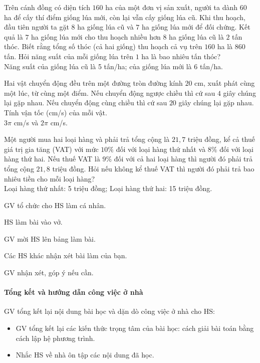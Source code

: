 \begin{baitap}[1.26]
	Trên cánh đồng có diện tích $160$ ha của một đơn vị sản xuất, người ta dành $60$ ha để cấy thí điểm giống lúa mới, còn lại vẫn cấy giống lúa cũ. Khi thu hoạch, đầu tiên người ta gặt $8$ ha giống lúa cũ và $7$ ha giống lúa mới để đối chứng. Kết quả là $7$ ha giống lúa mới cho thu hoạch nhiều hơn $8$ ha giống lúa cũ là $2$ tấn thóc. Biết rằng tổng số thóc (cả hai giống) thu hoạch cả vụ trên $160$ ha là $860$ tấn. Hỏi năng suất của mỗi giống lúa trên $1$ ha là bao nhiêu tấn thóc?
	\doicot
	\huongdan\\
	Năng suất của giống lúa cũ là 5 tấn/ha; của giống lúa mới là 6 tấn/ha.
\end{baitap}

\begin{baitap}[1.27]
	Hai vật chuyển động đều trên một đường tròn đường kính $20$ cm, xuất phát cùng một lúc, từ cùng một điểm. Nếu chuyển động ngược chiều thì cứ sau $4$ giây chúng lại gặp nhau. Nếu chuyển động cùng chiều thì cứ sau $20$ giây chúng lại gặp nhau. Tính vận tốc (cm/s) của mỗi vật.
	\doicot
	\huongdan\\
	$3\pi$ cm/s và $2\pi$ cm/s.
\end{baitap}

\begin{baitap}[1.28]
	Một người mua hai loại hàng và phải trả tổng cộng là $21{,}7$ triệu đồng, kể cả thuế giá trị gia tăng (VAT) với mức $10 \%$ đối với loại hàng thứ nhất và $8 \%$ đối với loại hàng thứ hai. Nếu thuế VAT là $9 \%$ đối với cả hai loại hàng thì người đó phải trả tổng cộng $21{,}8$ triệu đồng. Hỏi nếu không kể thuế VAT thì người đó phải trả bao nhiêu tiền cho mỗi loại hàng?
	\doicot
	\huongdan\\
	Loại hàng thứ nhất: 5 triệu đồng; Loại hàng thứ hai: 15 triệu đồng.
\end{baitap}

\tochucthuchien

\begin{tcth}[baitap={từ 1.25 đến 1.28}]
	\buocmot
	\item GV tổ chức cho HS làm cá nhân.
	\buochai
	\item HS làm bài vào vở.
	\item GV mời HS lên bảng làm bài.
	\buocba
	\item Các HS khác nhận xét bài làm của bạn.
	\buocbon
	\item GV nhận xét, góp ý nếu cần.
\end{tcth}

\paragraph{Tổng kết và hướng dẫn công việc ở nhà}

GV tổng kết lại nội dung bài học và dặn dò công việc ở nhà cho HS:
\begin{itemize}
	\item GV tổng kết lại các kiến thức trọng tâm của bài học: cách giải bài toán bằng cách lập hệ phương trình.
	\item Nhắc HS về nhà ôn tập các nội dung đã học.
\end{itemize}